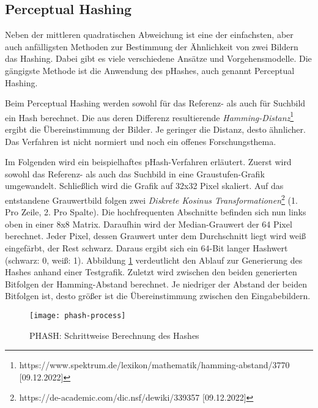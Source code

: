 \subsection{Perceptual Hashing}
Neben der mittleren quadratischen Abweichung ist eine der einfachsten, aber auch
anfälligsten Methoden zur Bestimmung der Ähnlichkeit von zwei Bildern das
Hashing. Dabei gibt es viele verschiedene Ansätze und Vorgehensmodelle. Die
gängigste Methode ist die Anwendung des pHashes, auch genannt Perceptual Hashing.
\parencite{hashing-apiumhub}

Beim Perceptual Hashing werden sowohl für das Referenz- als auch für Suchbild
ein Hash berechnet. Die aus deren Differenz resultierende
\textit{Hamming-Distanz}\footnote{https://www.spektrum.de/lexikon/mathematik/hamming-abstand/3770 [09.12.2022]}
ergibt die Übereinstimmung der Bilder. Je geringer die Distanz, desto ähnlicher.
Das Verfahren ist nicht normiert und noch ein offenes Forschungsthema.
\parencite{hashing-phash}

Im Folgenden wird ein beispielhaftes pHash-Verfahren erläutert. Zuerst wird
sowohl das Referenz- als auch das Suchbild in eine Graustufen-Grafik
umgewandelt. Schließlich wird die Grafik auf 32x32 Pixel skaliert. Auf das
entstandene Grauwertbild folgen zwei \textit{Diskrete Kosinus Transformationen}\footnote{https://de-academic.com/dic.nsf/dewiki/339357 [09.12.2022]}
(1. Pro Zeile, 2. Pro Spalte). Die hochfrequenten Abschnitte befinden sich nun links
oben in einer 8x8 Matrix. Daraufhin wird der Median-Grauwert der 64 Pixel
berechnet. Jeder Pixel, dessen Grauwert unter dem Durchschnitt liegt wird weiß
eingefärbt, der Rest schwarz. Daraus ergibt sich ein 64-Bit langer Hashwert
(schwarz: 0, weiß: 1). Abbildung \ref{fig:phash-process} verdeutlicht den 
Ablauf zur Generierung des Hashes anhand einer Testgrafik. Zuletzt wird zwischen
den beiden generierten Bitfolgen der Hamming-Abstand berechnet. Je niedriger der
Abstand der beiden Bitfolgen ist, desto größer ist die Übereinstimmung zwischen
den Eingabebildern. \parencite{hashing-apiumhub}

\begin{figure}[H]
    \centering
    \texttt{[image: phash-process]}
    \caption{PHASH: Schrittweise Berechnung des Hashes}
    \label{fig:phash-process}
\end{figure}

